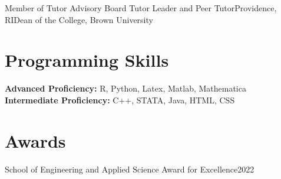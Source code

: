 \documentclass[10pt,a4paper,roman]{moderncv}        %
\begin{document}
{Member of Tutor Advisory Board}
{Tutor Leader and Peer Tutor}{Providence, RI}{Dean of the College, Brown
  University}
{
}


\section{Programming Skills}
\textbf{Advanced Proficiency: } R, Python, Latex, Matlab, Mathematica\\
\textbf{Intermediate Proficiency: } C++, STATA, Java, HTML, CSS


\section{Awards}
{School of Engineering and Applied Science Award for Excellence}{2022}
{}{}
\end{document}
